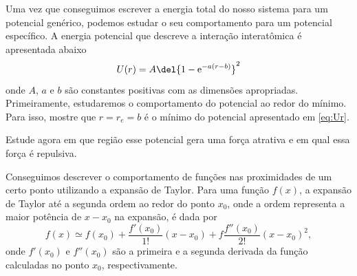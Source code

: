 \documentclass[]{IMTexam}
\begin{document}
\begin{questions}
	\question \label{ques:q2}
	Uma vez que conseguimos escrever a energia total do nosso sistema para um potencial genérico, podemos estudar o seu comportamento para um potencial específico. A energia potencial que descreve a interação interatômica é apresentada abaixo
	\begin{equation}\label{eq:Ur}
		U(r) = A\del{1 - \mathrm{e}^{-a(r-b)}}^{2}
	\end{equation}
	onde $ A $, $ a $ e $ b $ são constantes positivas com as dimensões apropriadas. Primeiramente, estudaremos o comportamento do potencial ao redor do mínimo. Para isso, mostre que $ r = r_e = b $ é o mínimo do potencial apresentado em \ref{eq:Ur}.

	\begin{solution}

	\end{solution}

	\question \label{ques:q3}
	Estude agora em que região esse potencial gera uma força atrativa e em qual essa força é repulsiva.

	\question \label{ques:q4}
	Conseguimos descrever o comportamento de funções nas proximidades de um certo ponto utilizando a expansão de Taylor. Para uma função $ f(x) $, a expansão de Taylor até a segunda ordem ao redor do ponto $ x_0 $, onde a ordem representa a maior potência de $ x - x_0 $ na expansão, é dada por
	\begin{equation}\label{eq:taylorS}
		f(x)\simeq f(x_0)+\dfrac{f'(x_0)}{1!}(x-x_0)+f\dfrac{f''(x_0)}{2!}(x-x_0)^{2},
	\end{equation}
	onde $ f'(x_0) $ e $ f''(x_0) $ são a primeira e a segunda derivada da função calculadas no ponto $ x_0 $, respectivamente.
	\begin{parts}

\end{parts}
\end{questions}
\end{document}
